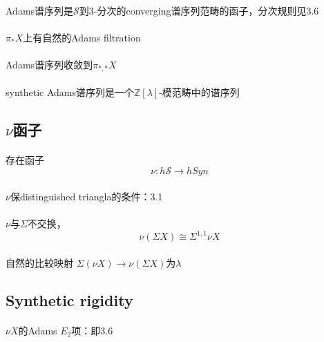 \documentclass[12pt,a4paper]{article}
\begin{document}
\begin{sloppy}
\paragraph{}Adams谱序列是$\mathcal{S}$到3-分次的converging谱序列范畴的函子，分次规则见3.6

\paragraph{}
$\pi_*X$上有自然的Adams filtration

\paragraph{}
Adams谱序列收敛到$\pi_{*,*}X$

\paragraph{}synthetic Adams谱序列是一个$\mathbb{Z}[\lambda]$-模范畴中的谱序列

\subsection{$\nu$函子}
\paragraph{} 存在函子
$$\nu: h\mathcal{S}\xrightarrow{} hSyn$$

\paragraph{}$\nu$保distinguished triangla的条件：3.1

\paragraph{} $\nu$与$\Sigma$不交换，
$$\nu(\Sigma X) \cong \Sigma^{1,1}\nu X$$

\paragraph{}
自然的比较映射
$\Sigma(\nu X) \xrightarrow{} \nu(\Sigma X)$为$\lambda$

\subsection{Synthetic rigidity}
\paragraph{}
$\nu X$的Adams $E_2$项：即3.6


\end{sloppy}
\end{document}
